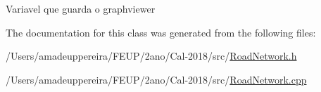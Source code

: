Variavel que guarda o graphviewer 

The documentation for this class was generated from the following files\+:\begin{DoxyCompactItemize}
\item 
/\+Users/amadeuppereira/\+F\+E\+U\+P/2ano/\+Cal-\/2018/src/\mbox{\hyperlink{_road_network_8h}{Road\+Network.\+h}}\item 
/\+Users/amadeuppereira/\+F\+E\+U\+P/2ano/\+Cal-\/2018/src/\mbox{\hyperlink{_road_network_8cpp}{Road\+Network.\+cpp}}\end{DoxyCompactItemize}
